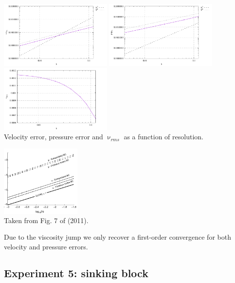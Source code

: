 \begin{center}
\includegraphics[width=5.6cm]{python_codes/fieldstone_158/results/exp3/errv}
\includegraphics[width=5.6cm]{python_codes/fieldstone_158/results/exp3/errp}
\includegraphics[width=5.6cm]{python_codes/fieldstone_158/results/exp3/vrms}\\
{\captionfont Velocity error, pressure error and $\upnu_{rms}$ as a function of resolution.}
\end{center}

\begin{center}
\includegraphics[width=4cm]{python_codes/fieldstone_158/images/dumg11_solcx}\\
{\captionfont Taken from Fig. 7 of \textcite{dumg11} (2011). }
\end{center}

Due to the viscosity jump we only recover a first-order convergence for both velocity and pressure errors.


\newpage
\subsection*{Experiment 5: sinking block}

